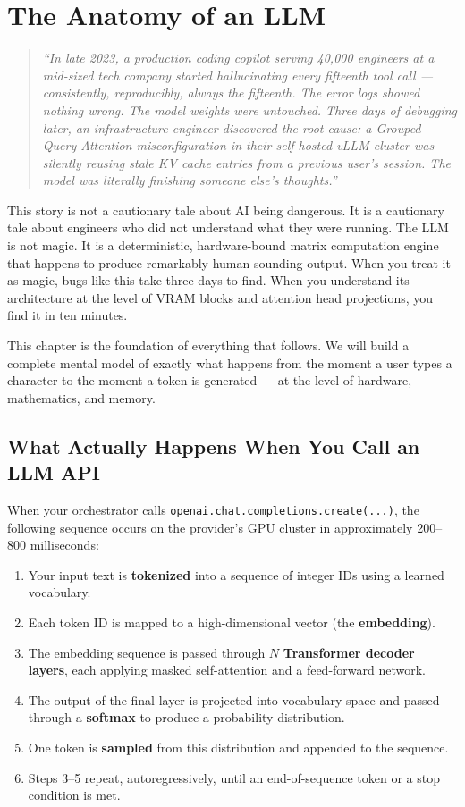 \chapter{The Anatomy of an LLM}

\begin{quote}
\textit{``In late 2023, a production coding copilot serving 40,000 engineers at a mid-sized tech company started hallucinating every fifteenth tool call — consistently, reproducibly, always the fifteenth. The error logs showed nothing wrong. The model weights were untouched. Three days of debugging later, an infrastructure engineer discovered the root cause: a Grouped-Query Attention misconfiguration in their self-hosted vLLM cluster was silently reusing stale KV cache entries from a previous user's session. The model was literally finishing someone else's thoughts.''}
\end{quote}

This story is not a cautionary tale about AI being dangerous. It is a cautionary tale about engineers who did not understand what they were running. The LLM is not magic. It is a deterministic, hardware-bound matrix computation engine that happens to produce remarkably human-sounding output. When you treat it as magic, bugs like this take three days to find. When you understand its architecture at the level of VRAM blocks and attention head projections, you find it in ten minutes.

This chapter is the foundation of everything that follows. We will build a complete mental model of exactly what happens from the moment a user types a character to the moment a token is generated — at the level of hardware, mathematics, and memory.

\section{What Actually Happens When You Call an LLM API}

When your orchestrator calls \texttt{openai.chat.completions.create(...)}, the following sequence occurs on the provider's GPU cluster in approximately 200--800 milliseconds:

\begin{enumerate}
    \item Your input text is \textbf{tokenized} into a sequence of integer IDs using a learned vocabulary.
    \item Each token ID is mapped to a high-dimensional vector (the \textbf{embedding}).
    \item The embedding sequence is passed through $N$ \textbf{Transformer decoder layers}, each applying masked self-attention and a feed-forward network.
    \item The output of the final layer is projected into vocabulary space and passed through a \textbf{softmax} to produce a probability distribution.
    \item One token is \textbf{sampled} from this distribution and appended to the sequence.
    \item Steps 3--5 repeat, autoregressively, until an end-of-sequence token or a stop condition is met.
\end{enumerate}

